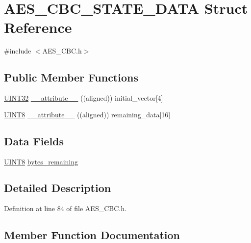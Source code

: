 \hypertarget{struct_a_e_s___c_b_c___s_t_a_t_e___d_a_t_a}{}\section{A\+E\+S\+\_\+\+C\+B\+C\+\_\+\+S\+T\+A\+T\+E\+\_\+\+D\+A\+T\+A Struct Reference}
\label{struct_a_e_s___c_b_c___s_t_a_t_e___d_a_t_a}


{\ttfamily \#include $<$A\+E\+S\+\_\+\+C\+B\+C.\+h$>$}

\subsection*{Public Member Functions}
\begin{DoxyCompactItemize}
\item 
\hyperlink{_generic_type_defs_8h_a1720f33f59b583f0c2ed071815623a86}{U\+I\+N\+T32} \hyperlink{struct_a_e_s___c_b_c___s_t_a_t_e___d_a_t_a_ad2c744d0f9ab0c4d4e7bd7c71718d5b3}{\+\_\+\+\_\+attribute\+\_\+\+\_\+} ((aligned)) initial\+\_\+vector\mbox{[}4\mbox{]}
\item 
\hyperlink{_generic_type_defs_8h_ab27e9918b538ce9d8ca692479b375b6a}{U\+I\+N\+T8} \hyperlink{struct_a_e_s___c_b_c___s_t_a_t_e___d_a_t_a_a31c384049837ef4e6d897e530589a2d6}{\+\_\+\+\_\+attribute\+\_\+\+\_\+} ((aligned)) remaining\+\_\+data\mbox{[}16\mbox{]}
\end{DoxyCompactItemize}
\subsection*{Data Fields}
\begin{DoxyCompactItemize}
\item 
\hyperlink{_generic_type_defs_8h_ab27e9918b538ce9d8ca692479b375b6a}{U\+I\+N\+T8} \hyperlink{struct_a_e_s___c_b_c___s_t_a_t_e___d_a_t_a_a32274d89fb92f1c74886d795bd7ba31c}{bytes\+\_\+remaining}
\end{DoxyCompactItemize}


\subsection{Detailed Description}


Definition at line 84 of file A\+E\+S\+\_\+\+C\+B\+C.\+h.



\subsection{Member Function Documentation}
\hypertarget{struct_a_e_s___c_b_c___s_t_a_t_e___d_a_t_a_ad2c744d0f9ab0c4d4e7bd7c71718d5b3}{}
